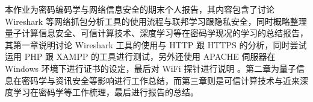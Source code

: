 \begin{cabstract}

本作业为密码编码学与网络信息安全的期末个人报告，其内容包含了讨论 Wireshark 等网络抓包分析工具的使用流程与联邦学习跟隐私安全，同时概略整理量子计算信息安全、可信计算技术、深度学习等在密码学现况的学习的总结报告，其第一章说明讨论 Wireshark 工具的使用与 HTTP 跟 HTTPS 的分析，同时尝试运用 PHP 跟 XAMPP 的工具进行测试，另外还使用 APACHE 伺服器在 Windows 环境下进行证书的设定，最后对 WiFi 探针进行说明 。第二章为量子信息在密码学与资讯安全等影响进行工作总结，而第三章则是可信计算技术与近来深度学习在密码学等工作梳理，最后进行报告的总结。

\end{cabstract}


